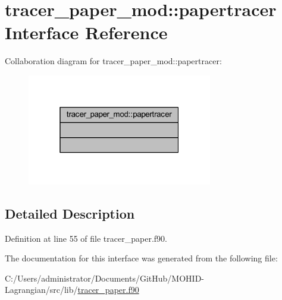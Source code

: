 \hypertarget{interfacetracer__paper__mod_1_1papertracer}{}\section{tracer\+\_\+paper\+\_\+mod\+:\+:papertracer Interface Reference}
\label{interfacetracer__paper__mod_1_1papertracer}


Collaboration diagram for tracer\+\_\+paper\+\_\+mod\+:\+:papertracer\+:\nopagebreak
\begin{figure}[H]
\begin{center}
\leavevmode
\includegraphics[width=229pt]{interfacetracer__paper__mod_1_1papertracer__coll__graph}
\end{center}
\end{figure}


\subsection{Detailed Description}


Definition at line 55 of file tracer\+\_\+paper.\+f90.



The documentation for this interface was generated from the following file\+:\begin{DoxyCompactItemize}
\item 
C\+:/\+Users/administrator/\+Documents/\+Git\+Hub/\+M\+O\+H\+I\+D-\/\+Lagrangian/src/lib/\mbox{\hyperlink{tracer__paper_8f90}{tracer\+\_\+paper.\+f90}}\end{DoxyCompactItemize}
